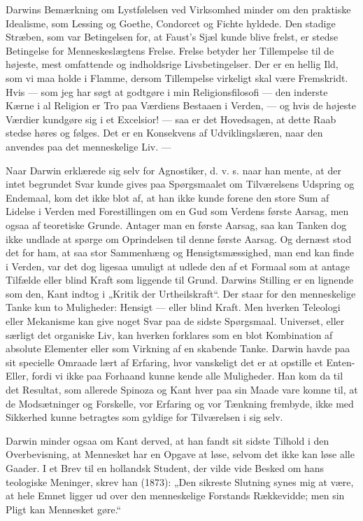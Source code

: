\documentclass[12pt,a4paper,openany]{book}
\newcommand{\opage}[1]{\marginnote{\footnotesize\textit{[#1]}}}
\begin{document}
Darwins Bemærkning om Lystfølelsen ved Virksomhed
minder om den praktiske Idealisme, som Lessing og Goethe,
Condorcet og Fichte hyldede. Den stadige Stræben, som var
Betingelsen for, at Faust’s Sjæl kunde blive frelst, er stedse
Betingelse for Menneskeslægtens Frelse. Frelse betyder her
Tillempelse til de højeste, mest omfattende og indholdsrige Livsbetingelser.
Der er en hellig Ild, som vi maa holde i Flamme,
dersom Tillempelse virkeligt skal være Fremskridt. Hvis
--- som jeg har søgt at godtgøre i min Religionsfilosofi --- den
inderste Kærne i al Religion er Tro paa Værdiens Bestaaen
i Verden, --- og hvis de højeste Værdier kundgøre sig i et
Excelsior! --- saa er det Hovedsagen, at dette Raab stedse
høres og følges. Det er en Konsekvens af Udviklingslæren,
naar den anvendes paa det menneskelige Liv. ---

Naar Darwin erklærede sig selv for Agnostiker, d. v. s.
naar han mente, at der intet begrundet Svar kunde gives paa
Spørgsmaalet om Tilværelsens Udspring og Endemaal, kom det
ikke blot af, at han ikke kunde forene den store Sum af Lidelse
i Verden med Forestillingen om en Gud som Verdens
første Aarsag, men ogsaa af teoretiske Grunde. Antager man
en første Aarsag, saa kan Tanken dog ikke undlade at spørge
om Oprindelsen til denne første Aarsag. Og dernæst stod det
for ham, at saa stor Sammenhæng og Hensigtsmæssighed, man
end kan finde i Verden, var det dog ligesaa umuligt at udlede
den af et Formaal som at antage Tilfælde eller blind Kraft som
liggende til Grund. Darwins Stilling er en lignende som den,
Kant indtog i „Kritik der Urtheilskraft“. Der staar for den
menneskelige Tanke kun to Muligheder: Hensigt --- eller blind
Kraft. Men hverken Teleologi eller Mekanisme kan give noget
Svar paa de sidste Spørgsmaal. Universet, eller særligt det
organiske Liv, kan hverken forklares som en blot Kombination
af absolute Elementer eller som Virkning af en skabende Tanke.
Darwin havde paa sit specielle Omraade lært af Erfaring, hvor
vanskeligt det er at opstille et Enten-Eller, fordi vi ikke paa
Forhaand kunne kende alle Muligheder. Han kom da til det
\setcounter{footnote}{0}%
\opage{228}Resultat, som allerede Spinoza og Kant hver paa sin Maade
vare komne til, at de Modsætninger og Forskelle, vor Erfaring
og vor Tænkning frembyde, ikke med Sikkerhed kunne betragtes
som gyldige for Tilværelsen i sig selv.

Darwin minder ogsaa om Kant derved, at han fandt sit
sidste Tilhold i den Overbevisning, at Mennesket har en Opgave
at løse, selvom det ikke kan løse alle Gaader. I et Brev
til en hollandsk Student, der vilde vide Besked om hans teologiske
Meninger, skrev han (1873): „Den sikreste Slutning
synes mig at være, at hele Emnet ligger ud over den menneskelige
Forstands Rækkevidde; men sin Pligt kan Mennesket
gøre.“
\end{document}
